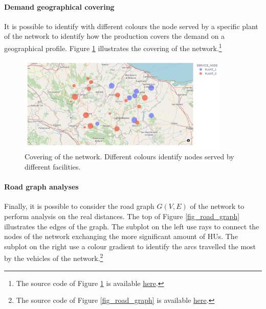\paragraph{Demand geographical covering}
It is possible to identify with different colours the node served by a specific plant of the network to identify how the production covers the demand on a geographical profile. Figure \ref{fig_graph_covering} illustrates the covering of the network.\footnote{The source code of Figure \ref{fig_graph_covering} is available \href{https://github.com/aletuf93/logproj/blob/master/examples/DIST_02\%20Location\%20assessment.ipynb}{here}.}

\begin{figure}[hbt!]
\centering
\includegraphics[width=0.9\textwidth]{SectionDistribution/control_figures/fig_graph_covering.png}
\captionsetup{type=figure}
\caption{Covering of the network. Different colours identify nodes served by different facilities.}
\label{fig_graph_covering}
\end{figure}

\paragraph{Road graph analyses}
Finally, it is possible to consider the road graph $G(V,E)$ of the network to perform analysis on the real distances. The top of Figure \ref{fig_road_graph} illustrates the edges of the graph. The subplot on the left use rays to connect the nodes of the network exchanging the more significant amount of HUs. The subplot on the right use a colour gradient to identify the arcs travelled the most by the vehicles of the network.\footnote{The source code of Figure \ref{fig_road_graph} is available \href{https://github.com/aletuf93/logproj/blob/master/examples/DIST_02\%20Location\%20assessment.ipynb}{here}.}

